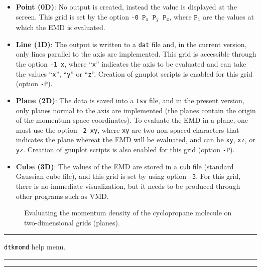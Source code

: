 \begin{itemize}
   \item \textbf{Point (0D)}: No output is created, instead the value is displayed at the screen. This grid is set by the option \texttt{-0 $\mathtt{P}_\mathtt{x}$ $\mathtt{P}_\mathtt{y}$ $\mathtt{P}_\mathtt{z}$}, where \texttt{$\mathtt{P}_\mathtt{i}$} are the values at which the EMD is evaluated.
   \item \textbf{Line (1D)}: The output is written to a \texttt{dat} file and, in the current version, only lines parallel to the axis are implemented. This grid is accessible through the option \texttt{-1 x}, where ``\texttt{x}'' indicates the axis to be evaluated and can take the values ``\texttt{x}'', ``\texttt{y}'' or ``\texttt{z}''. Creation of gnuplot scripts is enabled for this grid (option \texttt{-P}).
   \item{\textbf{Plane (2D)}}: The data is saved into a \texttt{tsv} file, and in the present version, only planes normal to the axis are implemented (the planes contain the origin of the momentum space coordinates). To evaluate the EMD in a plane, one must use the option \texttt{-2 xy}, where \texttt{xy} are two non-spaced characters that indicates the plane whereat the EMD will be evaluated, and can be \texttt{xy}, \texttt{xz}, or \texttt{yz}. Creation of gnuplot scripts is also enabled for this grid (option \texttt{-P}).
   \item{\textbf{Cube (3D)}}: The values of the EMD are stored in a \texttt{cub} file (standard Gaussian cube file), and this grid is set by using option \texttt{-3}. For this grid, there is no immediate visualization, but it needs to be produced through other programs such as VMD.
\end{itemize}
%
\begin{figure}[hb!]
\centering
{}\quad
{}
\caption{Evaluating the momentum density of the cyclopropane molecule on two-dimensional grids (planes).}\label{fig:dtkmomdusex}
\end{figure}
%

\rule{\textwidth}{1pt}
{\center\texttt{dtkmomd} help menu.\\}
\rule{\textwidth}{1pt}
\begin{footnotesize}
\end{footnotesize}
\rule{\textwidth}{1pt}



